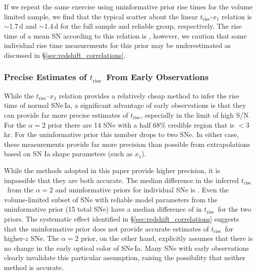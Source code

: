 \documentclass[twocolumn]{./aastex63}
\newcommand{\trise}{$t_\mathrm{rise}$}
\begin{document}
If we repeat the same exercise using uninformative prior rise times for the
volume limited sample, we find that the typical scatter about the linear
\trise-$x_1$ relation is $\sim$1.7\,d and $\sim$1.4\,d for the full sample and
reliable group, respectively. The rise time of a mean SN according to this
relation is , however, we caution that some individual
rise time measurements for this prior may be underestimated as discussed in
\S\ref{sec:redshift_correlations}.

\subsubsection{Precise Estimates of \trise\ From Early Observations}

While the \trise--$x_1$ relation provides a relatively cheap method to infer
the rise time of normal SNe\,Ia, a significant advantage of early observations
is that they can provide far more precise estimates of \trise, especially in
the limit of high S/N. For the $\alpha = 2$ prior there are 14 SNe with a half
68\% credible region that is $< 3$\,hr. For the uninformative prior this
number drops to two SNe. In either case, these measurements provide far more
precision than possible from extrapolations based on SN Ia shape parameters
(such as $x_1$).

While the methods adopted in this paper provide higher precision, it is
impossible that they are both accurate. The median difference in the inferred
\trise\ from the $\alpha = 2$ and uninformative priors for individual SNe is
. Even the volume-limited subset of SNe with reliable model
parameters from the uninformative prior (15 total SNe) have a median
difference of  in \trise\ for the two priors. The systematic
effect identified in \S\ref{sec:redshift_correlations} suggests that the
uninformative prior does not provide accurate estimates of \trise\ for
higher-$z$ SNe. The $\alpha = 2$ prior, on the other hand, explicitly assumes
that there is no change in the early optical color of SNe\,Ia. Many SNe with
early observations clearly invalidate this particular assumption, raising the
possibility that neither method is accurate.
\end{document}
